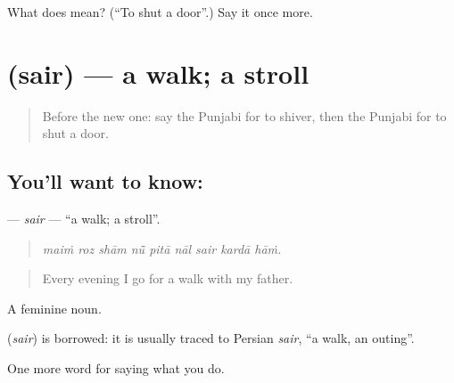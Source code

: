 \begin{tcolorbox}[breakable,colback=teal!4,colframe=teal!35!black,title={Before you move on}]
What does  mean? (\textquotedblleft{}To shut a door\textquotedblright{}.) Say it once more.
\end{tcolorbox}
\section[\texorpdfstring{\pa{ਸੈਰ} (sair)}{ਸੈਰ (sair)}]{ (sair) — a walk; a stroll}

\label{lesson:PA-C226-sair}



\begin{quote}
Before the new one: say the Punjabi for to shiver, then the Punjabi for to shut a door.
\end{quote}

\subsection*{You'll want to know: }
\textbf{} — \emph{sair} — \textquotedblleft{}a walk; a stroll\textquotedblright{}.

\begin{quote}
        
\end{quote}

\begin{quote}
\emph{maiṁ roz shām nū̃ pitā nāl sair kardā hāṁ.}
\end{quote}

\begin{quote}
Every evening I go for a walk with my father.
\end{quote}

A feminine noun.

\begin{cousinweb}
\textbf{} (\emph{sair}) is borrowed: it is usually traced to Persian \emph{sair}, \textquotedblleft{}a walk, an outing\textquotedblright{}.
\end{cousinweb}

\begin{grammarlens}[title={What you've built}]
One more word for saying what you do.
\end{grammarlens}

